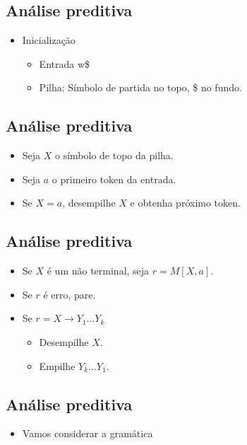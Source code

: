 \documentclass[11pt]{article}
\begin{document}
\subsection*{Análise preditiva}
\label{sec:org4b24c8c}

\begin{itemize}
\item Inicialização
\begin{itemize}
\item Entrada w\$
\item Pilha: Símbolo de partida no topo, \$ no fundo.
\end{itemize}
\end{itemize}
\subsection*{Análise preditiva}
\label{sec:orgffb9ea0}

\begin{itemize}
\item Seja \(X\) o símbolo de topo da pilha.
\item Seja \(a\) o primeiro token da entrada.
\item Se \(X = a\), desempilhe \(X\) e obtenha próximo token.
\end{itemize}
\subsection*{Análise preditiva}
\label{sec:org3bd87db}

\begin{itemize}
\item Se \(X\) é um não terminal, seja \(r = M[X,a]\).

\item Se \(r\) é erro, pare.

\item Se \(r = X \to Y_1 ... Y_k\)
\begin{itemize}
\item Desempilhe \(X\).
\item Empilhe \(Y_k ... Y_1\).
\end{itemize}
\end{itemize}
\subsection*{Análise preditiva}
\label{sec:org292f1b5}

\begin{itemize}
\item Vamos considerar a gramática
\end{itemize}
\end{document}
